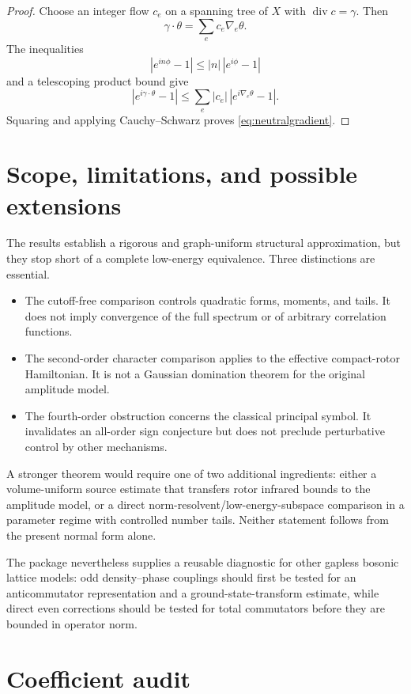 \documentclass[11pt]{article}
\newcommand{\diver}{\operatorname{div}}
\begin{document}
\begin{proof}
Choose an integer flow $c_e$ on a spanning tree of $X$ with $\diver c=\gamma$. Then
\[
\gamma\cdot\theta=\sum_ec_e\nabla_e\theta.
\]
The inequalities
\[
|e^{in\phi}-1|\le |n|\,|e^{i\phi}-1|
\]
and a telescoping product bound give
\[
|e^{i\gamma\cdot\theta}-1|
\le \sum_e|c_e|\,|e^{i\nabla_e\theta}-1|.
\]
Squaring and applying Cauchy--Schwarz proves \eqref{eq:neutralgradient}.
\end{proof}

\section{Scope, limitations, and possible extensions}

The results establish a rigorous and graph-uniform structural approximation, but they stop short of a complete low-energy equivalence. Three distinctions are essential.
\begin{itemize}
    \item The cutoff-free comparison controls quadratic forms, moments, and tails. It does not imply convergence of the full spectrum or of arbitrary correlation functions.
    \item The second-order character comparison applies to the effective compact-rotor Hamiltonian. It is not a Gaussian domination theorem for the original amplitude model.
    \item The fourth-order obstruction concerns the classical principal symbol. It invalidates an all-order sign conjecture but does not preclude perturbative control by other mechanisms.
\end{itemize}

A stronger theorem would require one of two additional ingredients: either a volume-uniform source estimate that transfers rotor infrared bounds to the amplitude model, or a direct norm-resolvent/low-energy-subspace comparison in a parameter regime with controlled number tails. Neither statement follows from the present normal form alone.

The package nevertheless supplies a reusable diagnostic for other gapless bosonic lattice models: odd density--phase couplings should first be tested for an anticommutator representation and a ground-state-transform estimate, while direct even corrections should be tested for total commutators before they are bounded in operator norm.

\appendix

\section{Coefficient audit}
\end{document}
